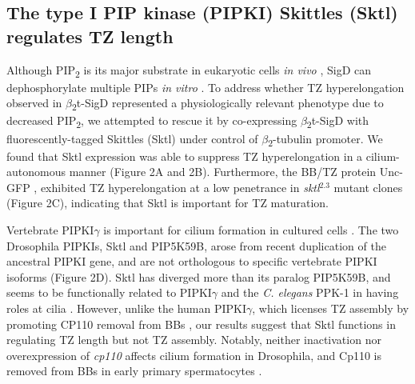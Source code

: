 \documentclass[12pt, twoside, letterpaper]{article}
\newcommand{\PIP}{PIP\textsubscript{2}}
\newcommand{\sigd}{$\beta$\textsubscript{2}t-SigD}
\begin{document}
\begin{doublespacing}
\begin{linenumbers}
    \subsection*{The type I PIP kinase (PIPKI) Skittles (Sktl) regulates TZ length}
    Although \PIP{} is its major substrate in eukaryotic cells \textit{in vivo}
    \citep{terebiznik2002elimination, zhou2001salmonella, sengupta2013depletion},
    SigD can dephosphorylate multiple PIPs \textit{in vitro}
    \citep{norris1998sopb}.
    To address whether TZ hyperelongation observed in \sigd{} represented a
    physiologically relevant phenotype due to decreased \PIP{},
    we attempted to rescue it by
    co-expressing \sigd{} with
    fluorescently-tagged Skittles (Sktl)
    under control of $\beta$\textsubscript{2}-tubulin promoter.
    We found that Sktl expression was able to suppress TZ hyperelongation
    in a cilium-autonomous manner (Figure 2A and 2B).
    Furthermore, the BB/TZ protein Unc-GFP
    \citep{baker2004mechanosensory, wei2008depletion},
    exhibited TZ hyperelongation at a low penetrance in \textit{sktl}$^{2.3}$
    mutant clones (Figure 2C),
    indicating that Sktl is important for TZ maturation.

    Vertebrate PIPKI$\gamma$ is important for cilium formation in cultured cells
    \citep{xu2016phosphatidylinositol}.
    The two Drosophila PIPKIs, Sktl and PIP5K59B,
    arose from recent duplication of
    the ancestral PIPKI gene,
    and are not orthologous to specific vertebrate PIPKI isoforms (Figure 2D).
    Sktl has diverged more than its paralog PIP5K59B, and seems
    to be functionally related to PIPKI$\gamma$
    and the \textit{C. elegans} PPK-1 in having roles at cilia \citep{xu2014pipkigamma}.
    However, unlike the human PIPKI$\gamma$, which licenses TZ assembly
    by promoting CP110 removal from BBs \citep{xu2016phosphatidylinositol},
    our results suggest that Sktl functions in
    regulating TZ length but not TZ assembly. 
    Notably, neither inactivation nor overexpression of \textit{cp110} affects
    cilium formation in Drosophila, and Cp110
    is removed from BBs in early primary spermatocytes
    \citep{franz2013cp110}.
    

\end{linenumbers}
\end{doublespacing}
\end{document}
